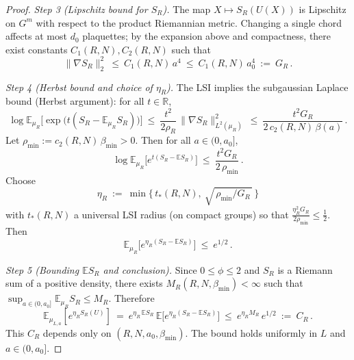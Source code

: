 \documentclass[11pt]{amsart}
\begin{document}
\begin{proof}
\emph{Step 3 (Lipschitz bound for $S_R$).} The map $X\mapsto S_R(U(X))$ is Lipschitz on $G^{m}$ with respect to the product Riemannian metric. Changing a single chord affects at most $d_0$ plaquettes; by the expansion above and compactness, there exist constants $C_1(R,N),C_2(R,N)$ such that
\[
  \|\nabla S_R\|_2^2\ \le\ C_1(R,N)\,a^4\ \le\ C_1(R,N)\,a_0^4\ :=\ G_R\,.
\]

\emph{Step 4 (Herbst bound and choice of $\eta_R$).} The LSI implies the subgaussian Laplace bound (Herbst argument): for all $t\in\mathbb{R}$,
\[
  \log\mathbb{E}_{\mu_R}\big[\exp\big(t(S_R-\mathbb{E}_{\mu_R}S_R)\big)\big]
  \ \le\ \frac{t^2}{2\rho_R}\,\|\nabla S_R\|_{L^2(\mu_R)}^2
  \ \le\ \frac{t^2 G_R}{2\,c_2(R,N)\,\beta(a)}\,.
\]
Let $\rho_{\min}:=c_2(R,N)\,\beta_{\min}>0$. Then for all $a\in(0,a_0]$,
\[
  \log\mathbb{E}_{\mu_R}\big[e^{t(S_R-\mathbb{E}S_R)}\big]\ \le\ \frac{t^2 G_R}{2\,\rho_{\min}}\,.
\]
Choose
\[
  \eta_R\ :=\ \min\Big\{\,t_*(R,N),\ \sqrt{\,\rho_{\min}/G_R\,}\,\Big\}
\]
with $t_*(R,N)$ a universal LSI radius (on compact groups) so that $\frac{\eta_R^2 G_R}{2\rho_{\min}}\le \tfrac12$. Then
\[
  \mathbb{E}_{\mu_R}\big[e^{\eta_R(S_R-\mathbb{E}S_R)}\big]\ \le\ e^{1/2}\,.
\]

\emph{Step 5 (Bounding $\mathbb{E}S_R$ and conclusion).} Since $0\le\phi\le 2$ and $S_R$ is a Riemann sum of a positive density, there exists $M_R(R,N,\beta_{\min})<\infty$ such that $\sup_{a\in(0,a_0]}\mathbb{E}_{\mu_R}S_R\le M_R$. Therefore
\[
  \mathbb{E}_{\mu_{L,a}}\!\left[e^{\eta_R S_R(U)}\right]
  \ =\ e^{\eta_R\,\mathbb{E}S_R}\,\mathbb{E}\big[e^{\eta_R(S_R-\mathbb{E}S_R)}\big]
  \ \le\ e^{\eta_R M_R}\,e^{1/2}
  \ :=\ C_R\,.
\]
This $C_R$ depends only on $(R,N,a_0,\beta_{\min})$. The bound holds uniformly in $L$ and $a\in(0,a_0]$.
\end{proof}
\end{document}
